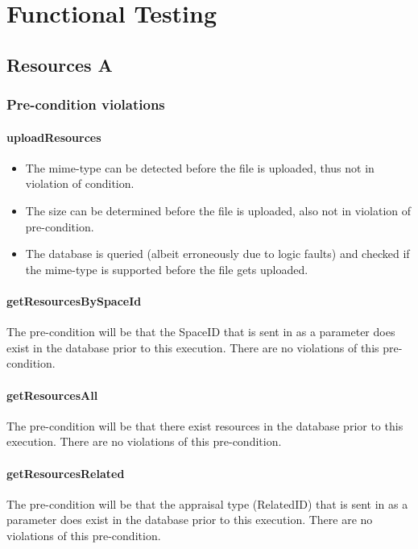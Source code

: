 \documentclass[a4paper]{article}
\begin{document}
\section {Functional Testing}

\subsection {Resources A}
\subsubsection {Pre-condition violations}

\paragraph{uploadResources}
\begin{itemize}
\item The mime-type can be detected before the file is uploaded, thus not in violation of condition.
\item The size can be determined before the file is uploaded, also not in violation of pre-condition.
\item The database is queried (albeit erroneously due to logic faults) and checked if the mime-type is supported before the file gets uploaded.
\end{itemize}

\paragraph{getResourcesBySpaceId}
The pre-condition will be that the SpaceID that is sent in as a parameter does exist in the database prior to this execution. There are no violations of this pre-condition.

\paragraph{getResourcesAll}
The pre-condition will be that there exist resources in the database prior to this execution. There are no violations of this pre-condition.

\paragraph{getResourcesRelated}
The pre-condition will be that the appraisal type (RelatedID) that is sent in as a parameter does exist in the database prior to this execution. There are no violations of this pre-condition. 
\end{document}
